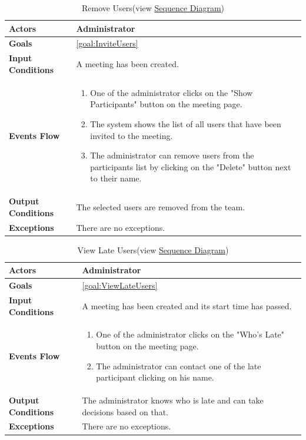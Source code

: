 \begin{table}[H]
	\centering
	\def\arraystretch{1.5}
	\begin{tabular}{|m{7cm}|m{7cm}|}
		\hline
		\textbf{Actors}            & Administrator    \\ \hline
		\textbf{Goals}             & \ref{goal:InviteUsers}           \\ \hline
		\textbf{Input Conditions}  & A meeting has been created.           \\ \hline
		\textbf{Events Flow}       & 
		\begin{enumerate}[topsep=0pt, leftmargin=*]
			\item One of the administrator clicks on the "Show Participants" button on the meeting page.
			\item The system shows the list of all users that have been invited to the meeting.
			\item The administrator can remove users from the participants list by clicking on the "Delete" button next to their name.
		\end{enumerate}            \\ \hline
		\textbf{Output Conditions} & The selected users are removed from the team.            \\ \hline
		\textbf{Exceptions}        & 
		There are no exceptions.         \\ \hline
	\end{tabular}
	\caption[Remove Users]{{Remove Users}\label{UseCaseDescr:RemoveUsers} (view \hyperref[SeqDiagr:RemoveUsers]{Sequence Diagram})}
\end{table}

\begin{table}[H]
	\centering
	\def\arraystretch{1.5}
	\begin{tabular}{|m{7cm}|m{7cm}|}
		\hline
		\textbf{Actors}            & Administrator    \\ \hline
		\textbf{Goals}             & \ref{goal:ViewLateUsers}           \\ \hline
		\textbf{Input Conditions}  & A meeting has been created and its start time has passed.         \\ \hline
		\textbf{Events Flow}       &  
		\begin{enumerate}[topsep=0pt, leftmargin=*]
			\item One of the administrator clicks on the "Who's Late" button on the meeting page.
			\item The administrator can contact one of the late participant clicking on his name.
		\end{enumerate}             \\ \hline
		\textbf{Output Conditions} & The administrator knows who is late and can take decisions based on that.           \\ \hline
		\textbf{Exceptions}        & There are no exceptions.           \\ \hline
	\end{tabular}
	\caption[View Late Users]{{View Late Users}\label{UseCaseDescr:LateUsers} (view \hyperref[SeqDiagr:LateUsers]{Sequence Diagram})}
\end{table}

